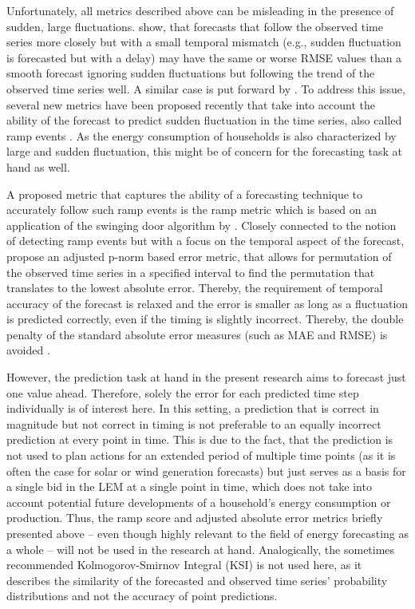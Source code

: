 Unfortunately, all metrics described above can be misleading in the presence of sudden, large fluctuations. \citet{Vallance:2017} show, that forecasts that follow the observed time series more closely but with a small temporal mismatch (e.g., sudden fluctuation is forecasted but with a delay) may have the same or worse RMSE values than a smooth forecast ignoring sudden fluctuations but following the trend of the observed time series well. A similar case is put forward by \citet{Haben:2014}. To address this issue, several new metrics have been proposed recently that take into account the ability of the forecast to predict sudden fluctuation in the time series, also called ramp events \citep{Zhang:2015}. As the energy consumption of households is also characterized by large and sudden fluctuation, this might be of concern for the forecasting task at hand as well.

A proposed metric that captures the ability of a forecasting technique to accurately follow such ramp events is the ramp metric \citep{Vallance:2017} which is based on an application of the swinging door algorithm by \citet{Florita:2013}. Closely connected to the notion of detecting ramp events but with a focus on the temporal aspect of the forecast, \citet{Haben:2014} propose an adjusted p-norm based error metric, that allows for permutation of the observed time series in a specified interval to find the permutation that translates to the lowest absolute error. Thereby, the requirement of temporal accuracy of the forecast is relaxed and the error is smaller as long as a fluctuation is predicted correctly, even if the timing is slightly incorrect. Thereby, the double penalty of the standard absolute error measures (such as MAE and RMSE) is avoided \citep{Haben:2014}.

However, the prediction task at hand in the present research aims to forecast just one value ahead. Therefore, solely the error for each predicted time step individually is of interest here. In this setting, a prediction that is correct in magnitude but not correct in timing is not preferable to an equally incorrect prediction at every point in time. This is due to the fact, that the prediction is not used to plan actions for an extended period of multiple time points (as it is often the case for solar or wind generation forecasts) but just serves as a basis for a single bid in the LEM at a single point in time, which does not take into account potential future developments of a household's energy consumption or production. Thus, the ramp score and adjusted absolute error metrics briefly presented above -- even though highly relevant to the field of energy forecasting as a whole -- will not be used in the research at hand. Analogically, the sometimes recommended Kolmogorov-Smirnov Integral (KSI) \citep{Espinar:2009} is not used here, as it describes the similarity of the forecasted and observed time series' probability distributions and not the accuracy of point predictions.


